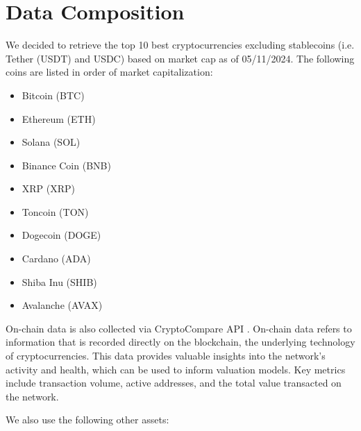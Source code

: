 \section{Data Composition}

We decided to retrieve the top 10 best cryptocurrencies excluding stablecoins (i.e. Tether (USDT) and USDC) based on market cap as of 05/11/2024. The following coins are listed in order of market capitalization: 

\begin{itemize}
    \item Bitcoin (BTC)
    \item Ethereum (ETH)
    \item Solana (SOL)
    \item Binance Coin (BNB)
    \item XRP (XRP)
    \item Toncoin (TON)
    \item Dogecoin (DOGE)
    \item Cardano (ADA)
    \item Shiba Inu (SHIB)
    \item Avalanche (AVAX)
\end{itemize}


On-chain data is also collected via CryptoCompare API \cite{cryptocompare_api}. On-chain data refers to information that is recorded directly on the blockchain, the underlying technology of cryptocurrencies. This data provides valuable insights into the network's activity and health, which can be used to inform valuation models. Key metrics include transaction volume, active addresses, and the total value transacted on the network.

We also use the following other assets:

